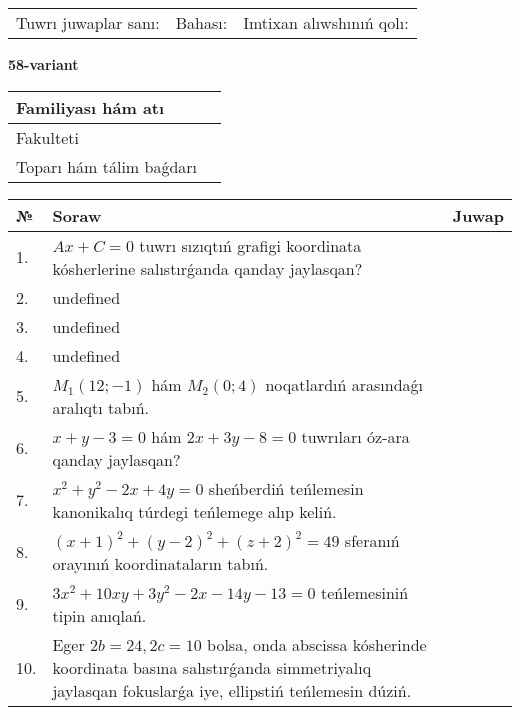 \documentclass{article}
\begin{document}
\vspace{0.7cm}

\begin{tabular}{lll}
Tuwrı juwaplar sanı: \underline{\hspace{1cm}} & 
Bahası: \underline{\hspace{1cm}} & 
Imtixan alıwshınıń qolı: \underline{\hspace{2cm}} \\
\end{tabular}

\egroup

\newpage


\textbf{58-variant}\\

\bgroup
\def\arraystretch{1.6} %

\begin{tabular}{|m{5.7cm}|m{9.5cm}|}
\hline
Familiyası hám atı & \\
\hline
Fakulteti  & \\
\hline
Toparı hám tálim baǵdarı  & \\
\hline
\end{tabular}

\vspace{0.7cm}

\begin{tabular}{|m{0.7cm}|m{10cm}|m{4cm}|}
\hline
№ & Soraw & Juwap \\
\hline
1. & \(Ax + C = 0\) tuwrı sızıqtıń grafigi koordinata kósherlerine salıstırǵanda qanday jaylasqan? &  \\
\hline
2. & undefined &  \\
\hline
3. & undefined &  \\
\hline
4. & undefined &  \\
\hline
5. & \(M_{1} (12; - 1)\) hám \(M_{2} (0;4)\) noqatlardıń arasındaǵı aralıqtı tabıń. &  \\
\hline
6. & \(x + y - 3 = 0\) hám \(2 x + 3 y - 8 = 0\) tuwrıları óz-ara qanday jaylasqan? &  \\
\hline
7. & \(x^{2} + y^{2} - 2 x + 4 y = 0\) sheńberdiń teńlemesin kanonikalıq túrdegi teńlemege alıp keliń. &  \\
\hline
8. & \((x + 1) ^{2} + (y - 2) ^{2} + (z + 2) ^{2} = 49\) sferanıń orayınıń koordinataların tabıń. &  \\
\hline
9. & \(3 x^{2} + 10 xy + 3 y^{2} - 2 x - 14 y - 13 = 0\) teńlemesiniń tipin anıqlań. &  \\
\hline
10. & Eger \(2 b = 24, 2 c = 10\) bolsa, onda abscissa kósherinde koordinata basına salıstırǵanda simmetriyalıq jaylasqan fokuslarǵa iye, ellipstiń teńlemesin dúziń. & \\
\hline
\end{tabular}
\end{document}

